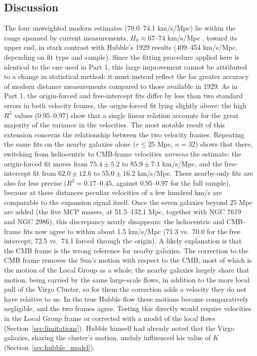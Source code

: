 \documentclass[11pt]{article}
\begin{document}
\subsection{Discussion}
\label{sec:discussion2}
The four unweighted modern estimates (70.0--74.1 km/s/Mpc) lie within the range spanned by current measurements, $H_0 \approx 67$--$74$ km/s/Mpc \citep{planck2020, riess2022, h0dn2026}, toward its upper end, in stark contrast with Hubble's 1929 results (409--454 km/s/Mpc, depending on fit type and sample). Since the fitting procedure applied here is identical to the one used in Part 1, this large improvement cannot be attributed to a change in statistical method: it must instead reflect the far greater accuracy of modern distance measurements compared to those available in 1929.
As in Part 1, the origin-forced and free-intercept fits differ by less than two standard errors in both velocity frames, the origin-forced fit lying slightly above; the high $R^2$ values (0.95--0.97) show that a single linear relation accounts for the great majority of the variance in the velocities.
The most notable result of this extension concerns the relationship between the two velocity frames. Repeating the same fits on the nearby galaxies alone ($r \le 25$ Mpc, $n=32$) shows that there, switching from heliocentric to CMB-frame velocities \emph{worsens} the estimate: the origin-forced fit moves from $75.4 \pm 5.2$ to $85.9 \pm 7.1$ km/s/Mpc, and the free-intercept fit from $62.0 \pm 12.6$ to $55.0 \pm 16.2$ km/s/Mpc. These nearby-only fits are also far less precise ($R^2 = 0.17$--$0.45$, against $0.95$--$0.97$ for the full sample), because at these distances peculiar velocities of a few hundred km/s are comparable to the expansion signal itself. Once the seven galaxies beyond 25 Mpc are added (the five MCP masers, at 51.5--132.1 Mpc, together with NGC 7619 and NGC 2986), this discrepancy nearly disappears: the heliocentric and CMB-frame fits now agree to within about 1.5 km/s/Mpc (71.3 vs.\ 70.0 for the free intercept; 72.5 vs.\ 74.1 forced through the origin). A likely explanation is that the CMB frame is the wrong reference for nearby galaxies. The correction to the CMB frame removes the Sun's motion with respect to the CMB, most of which is the motion of the Local Group as a whole; the nearby galaxies largely share that motion, being carried by the same large-scale flows, in addition to the more local pull of the Virgo Cluster, so for them the correction adds a velocity they do not have relative to us. In the true Hubble flow these motions become comparatively negligible, and the two frames agree. Testing this directly would require velocities in the Local Group frame or corrected with a model of the local flows (Section~\ref{sec:limitations}). Hubble himself had already noted that the Virgo galaxies, sharing the cluster's motion, unduly influenced his value of $K$ (Section~\ref{sec:hubble_model}).
\end{document}
